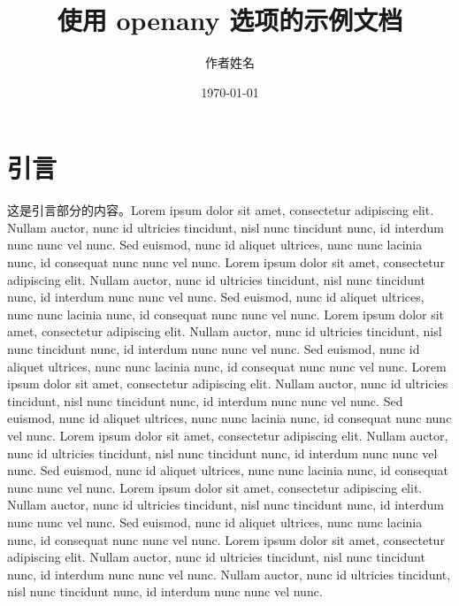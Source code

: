 \documentclass[nodate,openany]{conveyoptions}
\title{使用 openany 选项的示例文档}
\author{作者姓名}
\date{\today}
\begin{document}
\maketitle

\chapter{引言}
这是引言部分的内容。Lorem ipsum dolor sit amet, consectetur adipiscing elit. Nullam auctor, nunc id ultricies tincidunt, nisl nunc tincidunt nunc, id interdum nunc nunc vel nunc. Sed euismod, nunc id aliquet ultrices, nunc nunc lacinia nunc, id consequat nunc nunc vel nunc. Lorem ipsum dolor sit amet, consectetur adipiscing elit. Nullam auctor, nunc id ultricies tincidunt, nisl nunc tincidunt nunc, id interdum nunc nunc vel nunc. Sed euismod, nunc id aliquet ultrices, nunc nunc lacinia nunc, id consequat nunc nunc vel nunc. Lorem ipsum dolor sit amet, consectetur adipiscing elit. Nullam auctor, nunc id ultricies tincidunt, nisl nunc tincidunt nunc, id interdum nunc nunc vel nunc. Sed euismod, nunc id aliquet ultrices, nunc nunc lacinia nunc, id consequat nunc nunc vel nunc. Lorem ipsum dolor sit amet, consectetur adipiscing elit. Nullam auctor, nunc id ultricies tincidunt, nisl nunc tincidunt nunc, id interdum nunc nunc vel nunc. Sed euismod, nunc id aliquet ultrices, nunc nunc lacinia nunc, id consequat nunc nunc vel nunc. Lorem ipsum dolor sit amet, consectetur adipiscing elit. Nullam auctor, nunc id ultricies tincidunt, nisl nunc tincidunt nunc, id interdum nunc nunc vel nunc. Sed euismod, nunc id aliquet ultrices, nunc nunc lacinia nunc, id consequat nunc nunc vel nunc. Lorem ipsum dolor sit amet, consectetur adipiscing elit. Nullam auctor, nunc id ultricies tincidunt, nisl nunc tincidunt nunc, id interdum nunc nunc vel nunc. Sed euismod, nunc id aliquet ultrices, nunc nunc lacinia nunc, id consequat nunc nunc vel nunc. Lorem ipsum dolor sit amet, consectetur adipiscing elit. Nullam auctor, nunc id ultricies tincidunt, nisl nunc tincidunt nunc, id interdum nunc nunc vel nunc. Nullam auctor, nunc id ultricies tincidunt, nisl nunc tincidunt nunc, id interdum nunc nunc vel nunc. 
\end{document}
